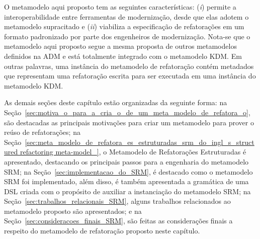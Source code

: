 O metamodelo aqui proposto tem as seguintes características: (\textit{i}) permite a interoperabilidade entre ferramentas de modernização, desde que elas adotem o metamodelo supracitado e (\textit{ii}) viabiliza a especificação de refatorações em um formato padronizado por parte dos engenheiros de modernização. Nota-se que o metamodelo aqui proposto segue a mesma proposta de outros metamodelos definidos na ADM e está totalmente integrado com o metamodelo KDM. Em outras palavras, uma instância do metamodelo de refatoração contém metadados que representam uma refatoração escrita para ser executada em uma instância do metamodelo KDM. %


As demais seções deste capítulo estão organizadas da seguinte forma: na Seção~\ref{sec:motiva_o_para_a_cria_o_de_um_meta_modelo_de_refatora_o}, são destacadas as principais motivações para criar um metamodelo para prover o reúso de refatorações; na Seção~\ref{sec:meta_modelo_de_refatora_es_estruturadas_srm_do_ingl_s_structured refactoring meta-model_}, o Metamodelo de Refatorações Estruturadas é apresentado, destacando os principais passos para a engenharia do metamodelo SRM; na Seção~\ref{sec:implementacao_do_SRM}, é destacado como o metamodelo SRM foi implementado, além disso, é também apresentada a gramática de uma DSL criada com o propósito de auxiliar a instanciação do metamodelo SRM; na Seção~\ref{sec:trabalhos_relacionais_SRM}, alguns trabalhos relacionados ao metamodelo proposto são apresentados; e na Seção~\ref{sec:consideracoes_finais_SRM}, são feitas as considerações finais a respeito do metamodelo de refatoração proposto neste capítulo.

